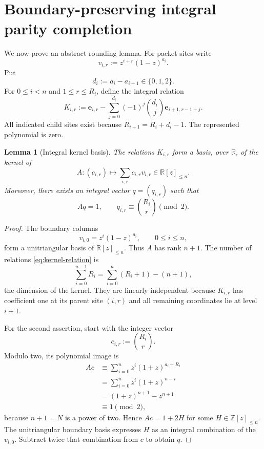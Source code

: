 \documentclass[11pt]{article}
\newtheorem{lemma}[theorem]{Lemma}
\theoremstyle{definition}
\theoremstyle{remark}
\begin{document}
\section{Boundary-preserving integral parity completion}

We now prove an abstract rounding lemma.  For packet sites write
\[
 v_{i,r}:=z^{i+r}(1-z)^{a_i}.
\]
Put
\[
 d_i:=a_i-a_{i+1}\in\{0,1,2\}.
\]
For $0\le i<n$ and $1\le r\le R_i$, define the integral relation
\begin{equation}\label{eq:kernel-relation}
 K_{i,r}
 :=\mathbf e_{i,r}
 -\sum_{j=0}^{d_i}(-1)^j\binom{d_i}{j}
  \mathbf e_{i+1,r-1+j}.
\end{equation}
All indicated child sites exist because $R_{i+1}=R_i+d_i-1$.  The represented polynomial is zero.

\begin{lemma}[Integral kernel basis]\label{lem:kernel-basis}
The relations $K_{i,r}$ form a basis, over $\mathbb R$, of the kernel of
\[
 A:(c_{i,r})\longmapsto\sum_{i,r}c_{i,r}v_{i,r}
 \in\mathbb R[z]_{\le n}.
\]
Moreover, there exists an integral vector $q=(q_{i,r})$ such that
\begin{equation}\label{eq:q-identity}
 Aq=1,
 \qquad
 q_{i,r}\equiv\binom{R_i}{r}\pmod2.
\end{equation}
\end{lemma}

\begin{proof}
The boundary columns
\[
 v_{i,0}=z^i(1-z)^{a_i},
 \qquad0\le i\le n,
\]
form a unitriangular basis of $\mathbb R[z]_{\le n}$.  Thus $A$ has rank $n+1$.  The number of relations \eqref{eq:kernel-relation} is
\[
 \sum_{i=0}^{n-1}R_i
 =\sum_{i=0}^{n}(R_i+1)-(n+1),
\]
the dimension of the kernel.  They are linearly independent because $K_{i,r}$ has coefficient one at its parent site $(i,r)$ and all remaining coordinates lie at level $i+1$.

For the second assertion, start with the integer vector
\[
 c_{i,r}:=\binom{R_i}{r}.
\]
Modulo two, its polynomial image is
\begin{align*}
 Ac
 &\equiv\sum_{i=0}^{n}z^i(1+z)^{a_i+R_i}\\
 &=\sum_{i=0}^{n}z^i(1+z)^{n-i}\\
 &=(1+z)^{n+1}-z^{n+1}\\
 &\equiv1\pmod2,
\end{align*}
because $n+1=N$ is a power of two.  Hence $Ac=1+2H$ for some $H\in\mathbb Z[z]_{\le n}$.  The unitriangular boundary basis expresses $H$ as an integral combination of the $v_{i,0}$.  Subtract twice that combination from $c$ to obtain $q$.
\end{proof}
\end{document}
